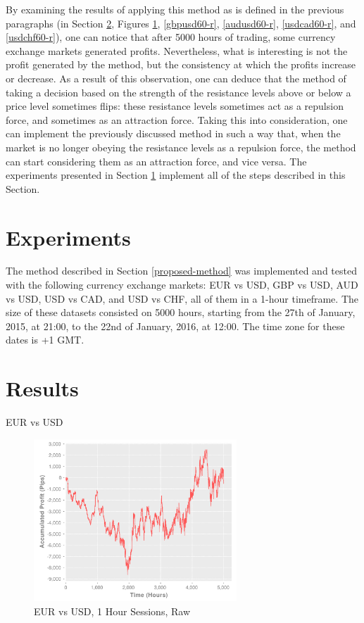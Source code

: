 \documentclass[letterpaper]{article}
\begin{document}
By examining the results of applying this method as is defined in the
previous paragraphs (in Section \ref{results}, Figures
\ref{eurusd60-r}, \ref{gbpusd60-r}, \ref{audusd60-r}, %
\ref{usdcad60-r}, and \ref{usdchf60-r}), one can notice that after
5000 hours of trading, some currency exchange markets generated
profits. Nevertheless, what is interesting is not the profit generated
by the method, but the consistency at which the profits increase or
decrease. As a result of this observation, one can deduce that the
method of taking a decision based on the strength of the resistance
levels above or below a price level sometimes flips: these resistance
levels sometimes act as a repulsion force, and sometimes as an
attraction force. Taking this into consideration, one can implement
the previously discussed method in such a way that, when the market is
no longer obeying the resistance levels as a repulsion force, the
method can start considering them as an attraction force, and vice
versa. The experiments presented in Section \ref{experiments}
implement all of the steps described in this Section.

\clearpage 

\section{Experiments}
\label{experiments}

The method described in Section \ref{proposed-method} was implemented
and tested with the following currency exchange markets: EUR vs USD,
GBP vs USD, AUD vs USD, USD vs CAD, and USD vs CHF, all of them in a
1-hour timeframe. The size of these datasets consisted on 5000 hours,
starting from the 27th of January, 2015, at 21:00, to the 22nd
of January, 2016, at 12:00. The time zone for these dates is +1 GMT.

\clearpage

\section{Results}
\label{results}

EUR vs USD

\begin{figure}[!t]
  \centering
  \includegraphics[width=3.0in]{eurusd60-r}
  \caption{EUR vs USD, 1 Hour Sessions, Raw}
  \label{eurusd60-r}
\end{figure}
\end{document}
